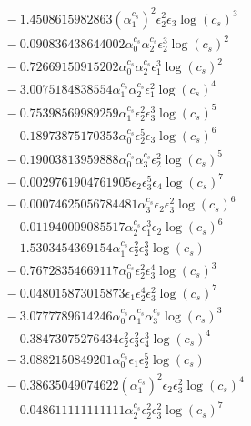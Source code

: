 \documentclass[10pt]{article}
\begin{document}
\begin{align*}
&{}  - 1.4508615982863 \left(\alpha_{1}^{c_s}\right)^{2} \epsilon_{2}^{2} \epsilon_{3} \log{\left(c_{s} \right)}^{3} \\
&{}  - 0.090836438644002 \alpha_{0}^{c_s} \alpha_{2}^{c_s} \epsilon_{2}^{3} \log{\left(c_{s} \right)}^{2} \\
&{}  - 0.72669150915202 \alpha_{0}^{c_s} \alpha_{2}^{c_s} \epsilon_{1}^{3} \log{\left(c_{s} \right)}^{2} \\
&{}  - 3.0075184838554 \alpha_{1}^{c_s} \alpha_{2}^{c_s} \epsilon_{1}^{2} \log{\left(c_{s} \right)}^{4} \\
&{}  - 0.75398569989259 \alpha_{1}^{c_s} \epsilon_{2}^{2} \epsilon_{3}^{3} \log{\left(c_{s} \right)}^{5} \\
&{}  - 0.18973875170353 \alpha_{0}^{c_s} \epsilon_{2}^{5} \epsilon_{3} \log{\left(c_{s} \right)}^{6} \\
&{}  - 0.19003813959888 \alpha_{0}^{c_s} \alpha_{3}^{c_s} \epsilon_{2}^{2} \log{\left(c_{s} \right)}^{5} \\
&{}  - 0.0029761904761905 \epsilon_{2} \epsilon_{3}^{5} \epsilon_{4} \log{\left(c_{s} \right)}^{7} \\
&{}  - 0.00074625056784481 \alpha_{3}^{c_s} \epsilon_{2} \epsilon_{3}^{2} \log{\left(c_{s} \right)}^{6} \\
&{}  - 0.011940009085517 \alpha_{2}^{c_s} \epsilon_{1}^{3} \epsilon_{2} \log{\left(c_{s} \right)}^{6} \\
&{}  - 1.5303454369154 \alpha_{1}^{c_s} \epsilon_{2}^{2} \epsilon_{3}^{3} \log{\left(c_{s} \right)} \\
&{}  - 0.76728354669117 \alpha_{0}^{c_s} \epsilon_{2}^{2} \epsilon_{3}^{4} \log{\left(c_{s} \right)}^{3} \\
&{}  - 0.048015873015873 \epsilon_{1} \epsilon_{2}^{4} \epsilon_{3}^{2} \log{\left(c_{s} \right)}^{7} \\
&{}  - 3.0777789614246 \alpha_{0}^{c_s} \alpha_{1}^{c_s} \alpha_{3}^{c_s} \log{\left(c_{s} \right)}^{3} \\
&{}  - 0.38473075276434 \epsilon_{2}^{2} \epsilon_{3}^{2} \epsilon_{4}^{3} \log{\left(c_{s} \right)}^{4} \\
&{}  - 3.0882150849201 \alpha_{0}^{c_s} \epsilon_{1} \epsilon_{2}^{5} \log{\left(c_{s} \right)} \\
&{}  - 0.38635049074622 \left(\alpha_{1}^{c_s}\right)^{2} \epsilon_{2} \epsilon_{3}^{2} \log{\left(c_{s} \right)}^{4} \\
&{}  - 0.048611111111111 \alpha_{2}^{c_s} \epsilon_{2}^{2} \epsilon_{3}^{2} \log{\left(c_{s} \right)}^{7} \\

\end{align*}
\end{document}
